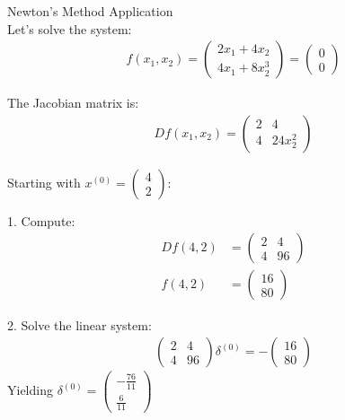 \begin{example2}{Newton's Method Application}\\
Let's solve the system:
\begin{align*}
f(x_1, x_2) = \begin{pmatrix} 2x_1 + 4x_2 \\ 4x_1 + 8x_2^3 \end{pmatrix} = \begin{pmatrix} 0 \\ 0 \end{pmatrix}
\end{align*}

The Jacobian matrix is:
\begin{align*}
Df(x_1, x_2) = \begin{pmatrix} 2 & 4 \\ 4 & 24x_2^2 \end{pmatrix}
\end{align*}

Starting with $x^{(0)} = \begin{pmatrix} 4 \\ 2 \end{pmatrix}$:

1. Compute:
   \begin{align*}
   Df(4, 2) &= \begin{pmatrix} 2 & 4 \\ 4 & 96 \end{pmatrix}\\
   f(4, 2) &= \begin{pmatrix} 16 \\ 80 \end{pmatrix}
   \end{align*}

2. Solve the linear system:
   \begin{align*}
   \begin{pmatrix} 2 & 4 \\ 4 & 96 \end{pmatrix}\delta^{(0)} = -\begin{pmatrix} 16 \\ 80 \end{pmatrix}
   \end{align*}
   Yielding $\delta^{(0)} = \begin{pmatrix} -\frac{76}{11} \\ \frac{6}{11} \end{pmatrix}$


\end{example2}
